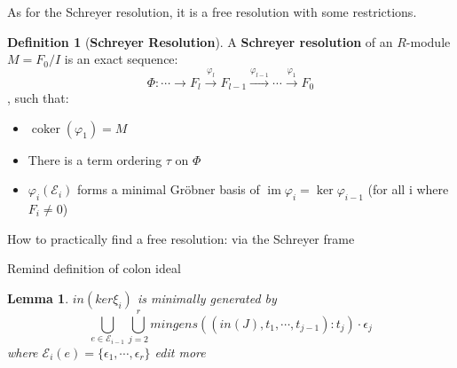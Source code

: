 \documentclass{article}
\newtheorem{lemma}[theorem]{Lemma}
\newcommand{\im}{\ensuremath{\operatorname{im}}}
\newcommand{\coker}{\ensuremath{\operatorname{coker}}}
\renewcommand{\to}{\ensuremath{\rightarrow}}
\theoremstyle{definition}
\newtheorem{definition}{Definition}[section]
\theoremstyle{remark}
\theoremstyle{example}
\begin{document}
As for the Schreyer resolution, it is a free resolution with some restrictions.

\begin{definition}[\textbf{Schreyer Resolution}]
    A \textbf{Schreyer resolution} of an $R$-module $M = F_0/I$ is an exact sequence:
    \begin{equation}
        \Phi: \cdots \rightarrow F_l \xrightarrow{\varphi_l} F_{l-1} \xrightarrow{\varphi_{l-1}} \cdots \xrightarrow{\varphi_1} F_0
    \end{equation}
    , such that:
    \begin{itemize}
        \item $\coker(\varphi_1) = M$
        \item There is a term ordering $\tau$ on $\Phi$
        \item $\varphi_i(\mathcal{E}_i)$ forms a minimal Gröbner basis of $\im \varphi_i = \ker \varphi_{i-1}$ (for all i where $F_i \neq 0$)
    \end{itemize}
\end{definition}






\textcolor{BrickRed}{How to practically find a free resolution: via the Schreyer frame}

\textcolor{BrickRed}{Remind definition of colon ideal}
\begin{lemma}\label{lem:mingens}
    $in(ker\xi_i)$ is minimally generated by
    \begin{equation}
        \bigcup_{e\in{\mathcal{E}}_{i-1}}{\bigcup_{j = 2}^{r}{mingens((in(J),t_1,\cdots,t_{j-1}):t_j)\cdot \epsilon_j}}
    \end{equation}
    where $\mathcal{E}_i(e) = \{\epsilon_1,\cdots,\epsilon_r\}$
    \textcolor{BrickRed}{edit more}
\end{lemma}
\end{document}
